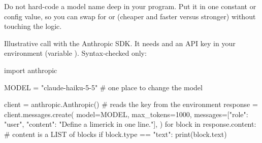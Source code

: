 \begin{gamerule}
Do not hard-code a model name deep in your program. Put it in one constant or config value, so you
can swap  for  or  (cheaper and
faster versus stronger) without touching the logic.
\end{gamerule}

Illustrative call with the Anthropic SDK. It needs  and an API key
in your environment (variable ). Syntax-checked only:

\begin{pycode}
import anthropic

MODEL = "claude-haiku-5-5"          # one place to change the model

client = anthropic.Anthropic()      # reads the key from the environment
response = client.messages.create(
    model=MODEL,
    max_tokens=1000,
    messages=[{"role": "user", "content": "Define a limerick in one line."}],
)
for block in response.content:      # content is a LIST of blocks
    if block.type == "text":
        print(block.text)
\end{pycode}

